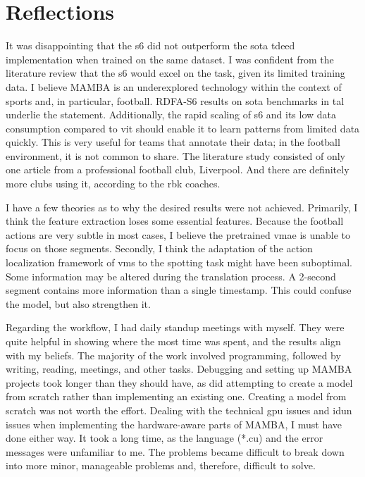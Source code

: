 \section{Reflections}


It was disappointing that the \acrfull{s6} did not outperform the \acrshort{sota} \acrshort{tdeed} implementation when trained on the same dataset. I was confident from the literature review that the \acrshort{s6} would excel on the task, given its limited training data. I believe MAMBA is an underexplored technology within the context of sports\cite{survey_of_survey} and, in particular, football\cite{seweryn_survey_2023}. RDFA-S6\cite{lee_enhancing_mamba_s6_2024} results on \acrshort{sota} benchmarks in \acrshort{tal} underlie the statement. Additionally, the rapid scaling of \acrshort{s6} and its low data consumption compared to \acrfull{vit} should enable it to learn patterns from limited data quickly. This is very useful for teams that annotate their data; in the football environment, it is not common to share. The literature study consisted of only one article from a professional football club, Liverpool. And there are definitely more clubs using it, according to the \acrshort{rbk} coaches. 

I have a few theories as to why the desired results were not achieved. Primarily, I think the feature extraction loses some essential features. Because the football actions are very subtle in most cases, I believe the pretrained \acrshort{vmae} is unable to focus on those segments. Secondly, I think the adaptation of the action localization framework of \acrshort{vms} to the spotting task might have been suboptimal. Some information may be altered during the translation process. A 2-second segment contains more information than a single timestamp. This could confuse the model, but also strengthen it. 


Regarding the workflow, I had daily standup meetings with myself. They were quite helpful in showing where the most time was spent, and the results align with my beliefs. The majority of the work involved programming, followed by writing, reading, meetings, and other tasks. Debugging and setting up MAMBA projects took longer than they should have, as did attempting to create a model from scratch rather than implementing an existing one. Creating a model from scratch was not worth the effort. Dealing with the technical \acrshort{gpu} issues and \acrshort{idun} issues when implementing the hardware-aware parts of MAMBA, I must have done either way. It took a long time, as the language (*.cu) and the error messages were unfamiliar to me. The problems became difficult to break down into more minor, manageable problems and, therefore, difficult to solve. 

